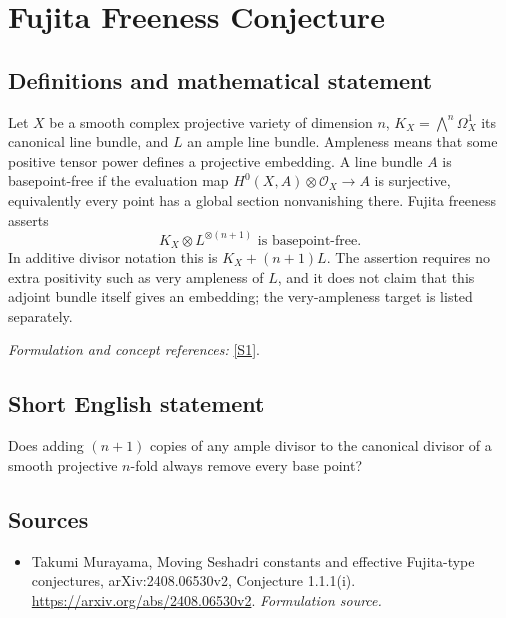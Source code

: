 \documentclass[11pt]{article}
\begin{document}
\section*{\texorpdfstring{Fujita Freeness Conjecture}{Fujita Freeness Conjecture}}\label{363}
\subsection{Definitions and mathematical statement}
Let $X$ be a smooth complex projective variety of dimension $n$, $K_X=\bigwedge^n\Omega_X^1$ its canonical line bundle, and $L$ an ample line bundle. Ampleness means that some positive tensor power defines a projective embedding. A line bundle $A$ is basepoint-free if the evaluation map $H^0(X,A)\otimes\mathcal O_X\to A$ is surjective, equivalently every point has a global section nonvanishing there. Fujita freeness asserts
\[
 K_X\otimes L^{\otimes(n+1)}\text{ is basepoint-free}.
\]
In additive divisor notation this is $K_X+(n+1)L$. The assertion requires no extra positivity such as very ampleness of $L$, and it does not claim that this adjoint bundle itself gives an embedding; the very-ampleness target is listed separately.
\par\smallskip\textit{Formulation and concept references:} \href{https://arxiv.org/abs/2408.06530v2}{[S1]}.

\subsection{Short English statement}
Does adding $(n+1)$ copies of any ample divisor to the canonical divisor of a smooth projective $n$-fold always remove every base point?
\subsection{Sources}
\begin{itemize}
\item[S1]Takumi Murayama, Moving Seshadri constants and effective Fujita-type conjectures, arXiv:2408.06530v2, Conjecture 1.1.1(i).
\url{https://arxiv.org/abs/2408.06530v2}.
\textit{Formulation source.}
\end{itemize}
\end{document}
